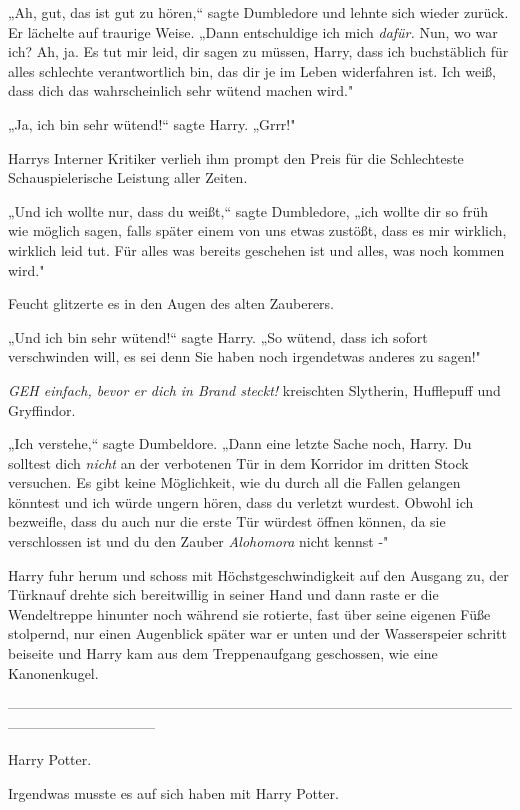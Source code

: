 {„Ah, gut, das ist gut zu hören,“ sagte Dumbledore und lehnte sich wieder zurück. Er lächelte auf traurige Weise. „Dann entschuldige ich mich \emph{dafür.} Nun, wo war ich? Ah, ja. Es tut mir leid, dir sagen zu müssen, Harry, dass ich buchstäblich für alles schlechte verantwortlich bin, das dir je im Leben widerfahren ist. Ich weiß, dass dich das wahrscheinlich sehr wütend machen wird."

„Ja, ich bin sehr wütend!“ sagte Harry. „Grrr!"

Harrys Interner Kritiker verlieh ihm prompt den Preis für die Schlechteste Schauspielerische Leistung aller Zeiten.

„Und ich wollte nur, dass du weißt,“ sagte Dumbledore, „ich wollte dir so früh wie möglich sagen, falls später einem von uns etwas zustößt, dass es mir wirklich, wirklich leid tut. Für alles was bereits geschehen ist und alles, was noch kommen wird."

Feucht glitzerte es in den Augen des alten Zauberers.

„Und ich bin sehr wütend!“ sagte Harry. „So wütend, dass ich sofort verschwinden will, es sei denn Sie haben noch irgendetwas anderes zu sagen!"

\emph{GEH einfach, bevor er dich in Brand steckt!} kreischten Slytherin, Hufflepuff und Gryffindor.

„Ich verstehe,“ sagte Dumbeldore. „Dann eine letzte Sache noch, Harry. Du solltest dich \emph{nicht} an der verbotenen Tür in dem Korridor im dritten Stock versuchen. Es gibt keine Möglichkeit, wie du durch all die Fallen gelangen könntest und ich würde ungern hören, dass du verletzt wurdest. Obwohl ich bezweifle, dass du auch nur die erste Tür würdest öffnen können, da sie verschlossen ist und du den Zauber \emph{Alohomora} nicht kennst -"

Harry fuhr herum und schoss mit Höchstgeschwindigkeit auf den Ausgang zu, der Türknauf drehte sich bereitwillig in seiner Hand und dann raste er die Wendeltreppe hinunter noch während sie rotierte, fast über seine eigenen Füße stolpernd, nur einen Augenblick später war er unten und der Wasserspeier schritt beiseite und Harry kam aus dem Treppenaufgang geschossen, wie eine Kanonenkugel.

--------------------------------------------------------------------------------------------------------------------------------------------

\hfill\break Harry Potter.

Irgendwas musste es auf sich haben mit Harry Potter.

}
